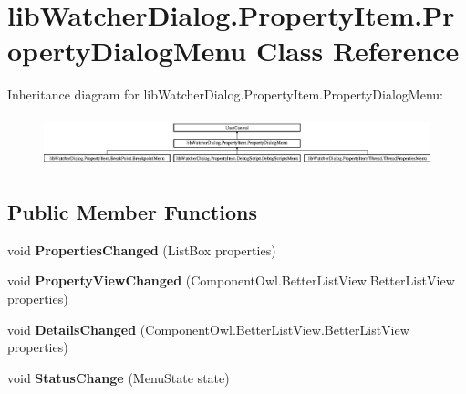 \hypertarget{classlib_watcher_dialog_1_1_property_item_1_1_property_dialog_menu}{\section{lib\+Watcher\+Dialog.\+Property\+Item.\+Property\+Dialog\+Menu Class Reference}
\label{classlib_watcher_dialog_1_1_property_item_1_1_property_dialog_menu}
}
Inheritance diagram for lib\+Watcher\+Dialog.\+Property\+Item.\+Property\+Dialog\+Menu\+:\begin{figure}[H]
\begin{center}
\leavevmode
\includegraphics[height=1.485411cm]{classlib_watcher_dialog_1_1_property_item_1_1_property_dialog_menu}
\end{center}
\end{figure}
\subsection*{Public Member Functions}
\begin{DoxyCompactItemize}
\item 
\hypertarget{classlib_watcher_dialog_1_1_property_item_1_1_property_dialog_menu_a48d53e9ffec04c3e61cb7951286b2215}{void {\bfseries Properties\+Changed} (List\+Box properties)}\label{classlib_watcher_dialog_1_1_property_item_1_1_property_dialog_menu_a48d53e9ffec04c3e61cb7951286b2215}

\item 
\hypertarget{classlib_watcher_dialog_1_1_property_item_1_1_property_dialog_menu_a49318d11976e7f299cc11a26dc1ece87}{void {\bfseries Property\+View\+Changed} (Component\+Owl.\+Better\+List\+View.\+Better\+List\+View properties)}\label{classlib_watcher_dialog_1_1_property_item_1_1_property_dialog_menu_a49318d11976e7f299cc11a26dc1ece87}

\item 
\hypertarget{classlib_watcher_dialog_1_1_property_item_1_1_property_dialog_menu_a9edae0a5f914d93a4762a006a8023e07}{void {\bfseries Details\+Changed} (Component\+Owl.\+Better\+List\+View.\+Better\+List\+View properties)}\label{classlib_watcher_dialog_1_1_property_item_1_1_property_dialog_menu_a9edae0a5f914d93a4762a006a8023e07}

\item 
\hypertarget{classlib_watcher_dialog_1_1_property_item_1_1_property_dialog_menu_a1ce2e89fe3287827bcac7ff3a8a734e7}{void {\bfseries Status\+Change} (Menu\+State state)}\label{classlib_watcher_dialog_1_1_property_item_1_1_property_dialog_menu_a1ce2e89fe3287827bcac7ff3a8a734e7}

\end{DoxyCompactItemize}
